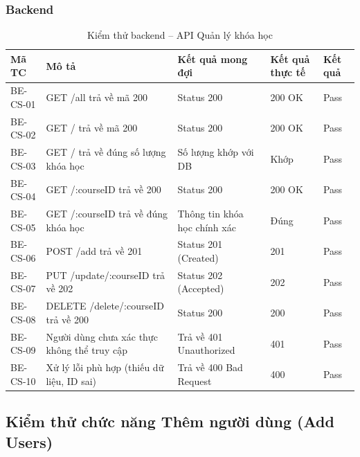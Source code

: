 \subsubsection{Backend}
\begin{table}[H]
\centering
\caption{Kiểm thử backend – API Quản lý khóa học}
\label{tab:be_course}
\begin{tabular}{|p{1.8cm}|p{4cm}|p{4cm}|p{2.2cm}|p{1.5cm}|}
\hline
\textbf{Mã TC} & \textbf{Mô tả} & \textbf{Kết quả mong đợi} & \textbf{Kết quả thực tế} & \textbf{Kết quả} \\ \hline
BE-CS-01 & GET /all trả về mã 200 & Status 200 & 200 OK & Pass \\ \hline
BE-CS-02 & GET / trả về mã 200 & Status 200 & 200 OK & Pass \\ \hline
BE-CS-03 & GET / trả về đúng số lượng khóa học & Số lượng khớp với DB & Khớp & Pass \\ \hline
BE-CS-04 & GET /:courseID trả về 200 & Status 200 & 200 OK & Pass \\ \hline
BE-CS-05 & GET /:courseID trả về đúng khóa học & Thông tin khóa học chính xác & Đúng & Pass \\ \hline
BE-CS-06 & POST /add trả về 201 & Status 201 (Created) & 201 & Pass \\ \hline
BE-CS-07 & PUT /update/:courseID trả về 202 & Status 202 (Accepted) & 202 & Pass \\ \hline
BE-CS-08 & DELETE /delete/:courseID trả về 200 & Status 200 & 200 & Pass \\ \hline
BE-CS-09 & Người dùng chưa xác thực không thể truy cập & Trả về 401 Unauthorized & 401 & Pass \\ \hline
BE-CS-10 & Xử lý lỗi phù hợp (thiếu dữ liệu, ID sai) & Trả về 400 Bad Request & 400 & Pass \\ \hline
\end{tabular}
\end{table}

\subsection{Kiểm thử chức năng Thêm người dùng (Add Users)}

